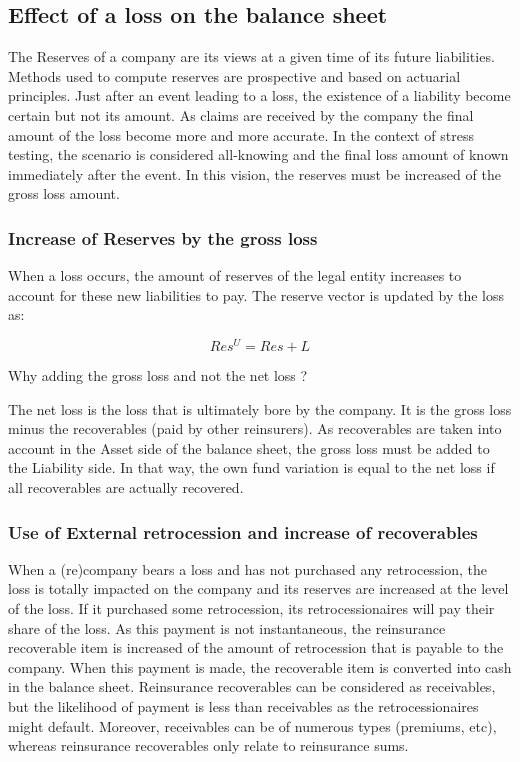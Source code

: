 \subsection{Effect of a loss on the balance sheet}

The Reserves of a company are its views at a given time of its future liabilities. Methods used to compute reserves are prospective and based on actuarial principles. Just after an event leading to a loss, the existence of a liability become certain but not its amount. As claims are received by the company the final amount of the loss become more and more accurate. In the context of stress testing, the scenario is considered all-knowing and the final loss amount of known immediately after the event. In this vision, the reserves must be increased of the gross loss amount. 


\subsubsection{Increase of Reserves by the gross loss}

When a loss occurs, the amount of reserves of the legal entity increases to account for these new liabilities to pay. The reserve vector is updated by the loss as:

\begin{equation}
    Res^U = Res + L
\end{equation}

Why adding the gross loss and not the net loss ? 

The net loss is the loss that is ultimately bore by the company. It is the gross loss minus the recoverables (paid by other reinsurers). As recoverables are taken into account in the Asset side of the balance sheet, the gross loss must be added to the Liability side. In that way, the own fund variation is equal to the net loss if all recoverables are actually recovered.


\subsubsection{Use of External retrocession and increase of recoverables}

When a (re)company bears a loss and has not purchased any retrocession, the loss is totally impacted on the company and its reserves are increased at the level of the loss. If it purchased some retrocession, its retrocessionaires will pay their share of the loss. As this payment is not instantaneous, the reinsurance recoverable item is increased of the amount of retrocession that is payable to the company. When this payment is made, the recoverable item is converted into cash in the balance sheet.
Reinsurance recoverables can be considered as receivables, but the likelihood of payment is less than receivables as the retrocessionaires might default. Moreover, receivables can be of numerous types (premiums, etc), whereas reinsurance recoverables only relate to reinsurance sums.

